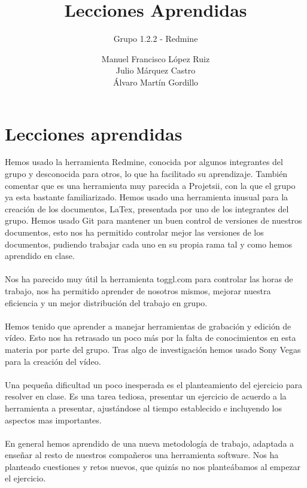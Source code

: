 \documentclass[a4paper,10pt]{scrartcl}
\title{Lecciones Aprendidas}
\subtitle{Grupo 1.2.2 - Redmine}
\author{
		Manuel Francisco López Ruiz\\
		Julio Márquez Castro\\
		Álvaro Martín Gordillo\\
		  }
\begin{document}
\clearpage\maketitle
\thispagestyle{empty}
\newpage




\section{Lecciones aprendidas}

Hemos usado la herramienta Redmine, conocida por algunos integrantes del grupo y desconocida para otros, lo que ha facilitado su aprendizaje. También comentar que es una herramienta muy parecida a Projetsii, con la que el grupo ya esta bastante familiarizado. Hemos usado una herramienta inusual para la creación de los documentos, LaTex, presentada por uno de los integrantes del grupo. Hemos usado Git para mantener un buen control de versiones de nuestros documentos, esto nos ha permitido controlar mejor las versiones de los documentos, pudiendo trabajar cada uno en su propia rama tal y como hemos aprendido en clase.\\\\

Nos ha parecido muy útil la herramienta toggl.com para controlar las horas de trabajo, nos ha permitido aprender de nosotros mismos, mejorar nuestra eficiencia y un mejor distribución del trabajo en grupo. \\\\

Hemos tenido que aprender a manejar herramientas de grabación y edición de vídeo. Esto nos ha retrasado un poco más por la falta de conocimientos en esta materia por parte del grupo. Tras algo de investigación hemos usado Sony Vegas para la creación del vídeo. \\\\

Una pequeña dificultad un poco inesperada es el planteamiento del ejercicio para resolver en clase. Es una tarea tediosa, presentar un ejercicio de acuerdo a la herramienta a presentar, ajustándose al tiempo establecido e incluyendo los aspectos mas importantes. \\\\

En general hemos aprendido de una nueva metodología de trabajo, adaptada a enseñar al resto de nuestros compañeros una herramienta software. Nos ha planteado cuestiones y retos nuevos, que quizás no nos planteábamos al empezar el ejercicio. 
\end{document}
